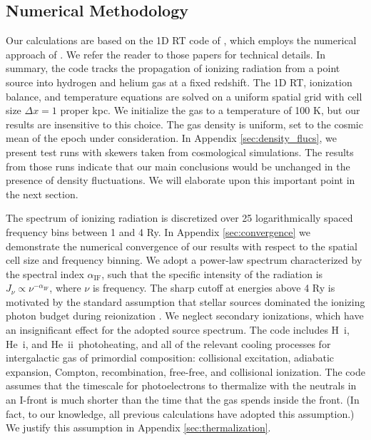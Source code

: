 \documentclass[twocolumn]{aastex62}
\newcommand{\HI}{H{\sc~i}}
\newcommand{\HeI}{He{\sc~i}}
\newcommand{\HeII}{He{\sc~ii}}
\newcommand{\spec}{\alpha_{\mathrm{IF}}}
\begin{document}
\subsection{Numerical Methodology}
\label{sec:methodology}

Our calculations are based on the 1D RT code of \citet{2016MNRAS.457.3006D}, which employs the numerical approach of \citet{2007MNRAS.374..493B}.  We refer the reader to those papers for technical details.  In summary, the code tracks the propagation of ionizing radiation from a point source into hydrogen and helium gas at a fixed redshift.  The 1D RT, ionization balance, and temperature equations are solved on a uniform spatial grid with cell size $\Delta x = 1$ proper kpc.  We initialize the gas to a temperature of 100 K, but our results are insensitive to this choice.  The gas density is uniform, set to the cosmic mean of the epoch under consideration.  { In Appendix \ref{sec:density_flucs}, we present test runs with skewers taken from cosmological simulations. The results from those runs indicate that our main conclusions would be unchanged in the presence of density fluctuations.  We will elaborate upon this important point in the next section.}  

The spectrum of ionizing radiation is discretized over 25 logarithmically spaced frequency bins between 1 and 4 Ry.  In Appendix \ref{sec:convergence} we demonstrate the numerical convergence of our results with respect to the spatial cell size and frequency binning.  We adopt a power-law spectrum characterized by the spectral index $\spec$, such that the specific intensity of the radiation is $J_{\nu} \propto \nu^{-\spec}$, where $\nu$ is frequency.  The sharp cutoff at energies above 4 Ry is motivated by the standard assumption that stellar sources dominated the ionizing photon budget during reionization \citep[e.g.][]{1987ApJ...321L.107S,2009ApJ...703.1416F,2012ApJ...746..125H,2013MNRAS.436.1023B,2017MNRAS.468.4691D}.  We neglect secondary ionizations, which have an insignificant effect for the adopted source spectrum.  The code includes \HI, \HeI, and \HeII\ photoheating, and all of the relevant cooling processes for intergalactic gas of primordial composition: collisional excitation, adiabatic expansion, Compton, recombination, free-free, and collisional ionization.  The code assumes that the timescale for photoelectrons to thermalize with the neutrals in an I-front is much shorter than the time that the gas spends inside the front. (In fact, to our knowledge, all previous calculations have adopted this assumption.)  We justify this assumption in Appendix \ref{sec:thermalization}.    
\end{document}
